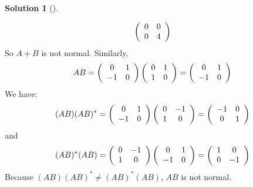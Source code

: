 \documentclass[numbers=enddot,12pt,final,onecolumn,notitlepage]{scrartcl}
\newcounter{sol}
\theoremstyle{definition}
\newtheorem{solu}[sol]{Solution}
\newenvironment{solution}[1][]
{\begin{solu}[#1]\begin{leftbar}}
        {\end{leftbar}\end{solu}}
\begin{document}
\begin{solution}
\[		\left(\begin{array}
				[c]{cc}%
				0 & 0 \\
				0 & 4 \\
			\end{array}\right)
	\]
	So $A + B$ is not normal.
	Similarly,
	\[
		AB = \left(\begin{array}
				[c]{cc}%
				0  & 1 \\
				-1 & 0 \\
			\end{array}\right)
		\left(\begin{array}
				[c]{cc}%
				0 & 1 \\
				1 & 0 \\
			\end{array}\right) =
		\left(\begin{array}
				[c]{cc}%
				0  & 1 \\
				-1 & 0 \\
			\end{array}\right)
	\]
	We have:
	\[
		(AB)(AB)^{\ast} = \left(\begin{array}
				[c]{cc}%
				0  & 1 \\
				-1 & 0 \\
			\end{array}\right)
		\left(\begin{array}
				[c]{cc}%
				0 & -1 \\
				1 & 0  \\
			\end{array}\right) =
		\left(\begin{array}
				[c]{cc}%
				-1 & 0 \\
				0  & 1 \\
			\end{array}\right)
	\]
	and
	\[
		(AB)^{\ast}(AB) = \left(\begin{array}
				[c]{cc}%
				0 & -1 \\
				1 & 0  \\
			\end{array}\right)
		\left(\begin{array}
				[c]{cc}%
				0  & 1 \\
				-1 & 0 \\
			\end{array}\right) =
		\left(\begin{array}
				[c]{cc}%
				1 & 0  \\
				0 & -1 \\
			\end{array}\right)
	\]
	Because $(AB)(AB)^{\ast} \neq (AB)^{\ast}(AB)$, $AB$ is not normal.

\end{solution}
\end{document}
